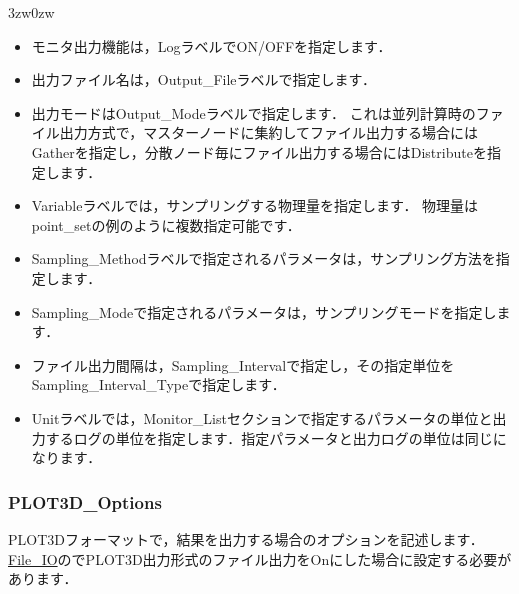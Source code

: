 \begin{indentation}{3zw}{0zw}
\begin{itemize}
\item モニタ出力機能は，LogラベルでON/OFFを指定します．
\item 出力ファイル名は，Output\_Fileラベルで指定します．
\item 出力モードはOutput\_Modeラベルで指定します．
これは並列計算時のファイル出力方式で，マスターノードに集約してファイル出力する場合にはGatherを指定し，分散ノード毎にファイル出力する場合にはDistributeを指定します．
\item Variableラベルでは，サンプリングする物理量を指定します．
物理量はpoint\_setの例のように複数指定可能です．
\item Sampling\_Methodラベルで指定されるパラメータは，サンプリング方法を指定します．
\item Sampling\_Modeで指定されるパラメータは，サンプリングモードを指定します．
\item ファイル出力間隔は，Sampling\_Intervalで指定し，その指定単位をSampling\_Interval\_Typeで指定します．
\item Unitラベルでは，Monitor\_Listセクションで指定するパラメータの単位と出力するログの単位を指定します．指定パラメータと出力ログの単位は同じになります．
\end{itemize}

\end{indentation}


\clearpage
\subsubsection{PLOT3D\_Options}

PLOT3Dフォーマットで，結果を出力する場合のオプションを記述します．
\hyperlink{tgt:fileio}{File\_IO}のでPLOT3D出力形式のファイル出力をOnにした場合に設定する必要があります．

